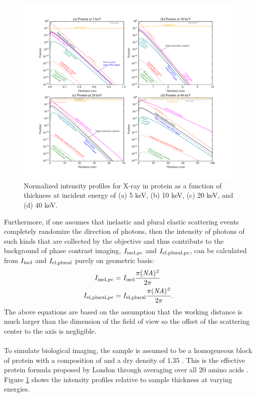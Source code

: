 \documentclass[review]{elsarticle}
\newcommand\inel{\textup{\scriptsize{inel}}}
\newcommand\elpl{\textup{\scriptsize{el,plural}}}
\newcommand\inelpc{\textup{\scriptsize{inel,pc}}}
\newcommand\elplpc{\textup{\scriptsize{el,plural,pc}}}
\begin{document}
\begin{figure}[!t]
\begin{center}
\includegraphics[scale=.6]{unimatrix_fig.pdf}
\caption{Normalized intensity profiles for X-ray in protein as a function of thickness at incident energy of (a) 5 keV, (b) 10 keV, (c) 20 keV, and (d) 40 keV.}
\label{fig:protein_x_cate}
\end{center}
\end{figure}

Furthermore, if one assumes that inelastic and plural elastic scattering events completely randomize the direction of photons, then the intensity of photons of such kinds that are collected by the objective and thus contribute to the background of phase contrast imaging, $I_{\inelpc}$ and $I_{\elplpc}$, can be calculated from $I_{\inel}$ and $I_{\elpl}$ purely on geometric basis:
\begin{align}
I_{\inelpc} &= I_{\inel}\frac{\pi (\it{NA})^2}{2\pi} \\
I_{\elplpc} &= I_{\elpl}\frac{\pi (\it{NA})^2}{2\pi}.
\end{align}
The above equations are based on the assumption that the working distance is much larger than the dimension of the field of view so the offset of the scattering center to the axis is negligible. 

\paragraph{} To simulate biological imaging, the sample is assumed to be a homogeneous block of protein with a composition of  and a dry density of 1.35 . This is the effective protein formula proposed by London through averaging over all 20 amino acids \cite{London:1989hh}. Figure \ref{fig:protein_x_cate} shows the intensity profiles relative to sample thickness at varying energies. 
\end{document}
